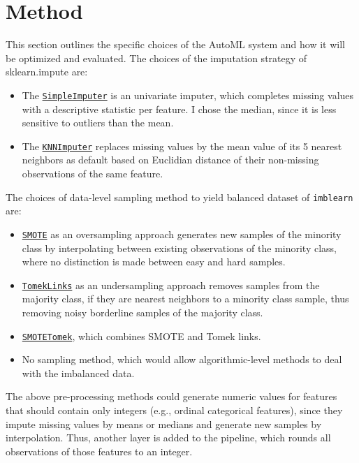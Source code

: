 \documentclass[11pt]{article}
\begin{document}
\section{Method}

This section outlines the specific choices of the AutoML system and how it will be optimized and evaluated. The choices of the imputation strategy of sklearn.impute are:
\begin{itemize}
\item The \href{https://scikit-learn.org/stable/modules/generated/sklearn.impute.SimpleImputer.html}{\texttt{SimpleImputer}} is an univariate imputer, which completes missing values with a descriptive statistic per feature. I chose the median, since it is less sensitive to outliers than the mean.
\item The \href{https://scikit-learn.org/stable/modules/generated/sklearn.impute.KNNImputer.html#sklearn.impute.KNNImputer}{\texttt{KNNImputer}} replaces missing values by the mean value of its 5 nearest neighbors as default based on Euclidian distance of their non-missing observations of the same feature. 
\end{itemize}

The choices of data-level sampling method to yield balanced dataset of \texttt{imblearn} are:
\begin{itemize}
\item \href{https://imbalanced-learn.org/stable/references/generated/imblearn.over_sampling.SMOTE.html}{\texttt{SMOTE}} as an oversampling approach generates new samples of the minority class by interpolating between existing observations of the minority class, where no distinction is made between easy and hard samples. 
\item \href{https://imbalanced-learn.org/stable/references/generated/imblearn.under_sampling.TomekLinks.html}{\texttt{TomekLinks}} as an undersampling approach removes samples from the majority class, if they are nearest neighbors to a minority class sample, thus removing noisy borderline samples of the majority class. 
\item \href{https://imbalanced-learn.org/stable/references/generated/imblearn.combine.SMOTETomek.html}{\texttt{SMOTETomek}}, which combines SMOTE and Tomek links.
\item No sampling method, which would allow algorithmic-level methods to deal with the imbalanced data. 
\end{itemize}

The above pre-processing methods could generate numeric values for features that should contain only integers (e.g., ordinal categorical features), since they impute missing values by means or medians and generate new samples by interpolation. Thus, another layer is added to the pipeline, which rounds all observations of those features to an integer. \\
\end{document}
